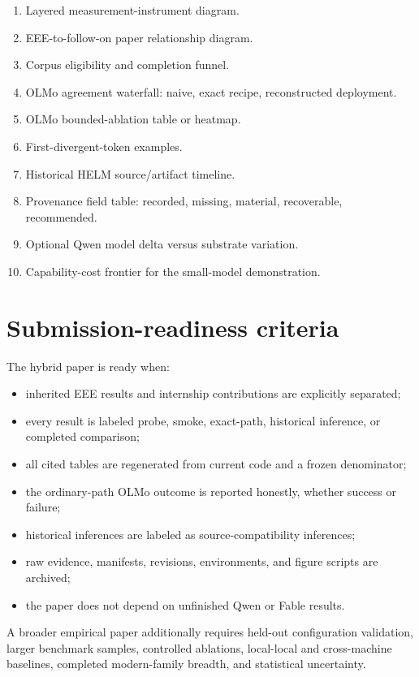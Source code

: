 \documentclass[11pt]{article}
\begin{document}
\begin{enumerate}
  \item Layered measurement-instrument diagram.
  \item EEE-to-follow-on paper relationship diagram.
  \item Corpus eligibility and completion funnel.
  \item OLMo agreement waterfall: naive, exact recipe, reconstructed deployment.
  \item OLMo bounded-ablation table or heatmap.
  \item First-divergent-token examples.
  \item Historical HELM source/artifact timeline.
  \item Provenance field table: recorded, missing, material, recoverable, recommended.
  \item Optional Qwen model delta versus substrate variation.
  \item Capability-cost frontier for the small-model demonstration.
\end{enumerate}

\section{Submission-readiness criteria}

The hybrid paper is ready when:

\begin{itemize}
  \item inherited EEE results and internship contributions are explicitly separated;
  \item every result is labeled probe, smoke, exact-path, historical inference, or completed comparison;
  \item all cited tables are regenerated from current code and a frozen denominator;
  \item the ordinary-path OLMo outcome is reported honestly, whether success or failure;
  \item historical inferences are labeled as source-compatibility inferences;
  \item raw evidence, manifests, revisions, environments, and figure scripts are archived;
  \item the paper does not depend on unfinished Qwen or Fable results.
\end{itemize}

A broader empirical paper additionally requires held-out configuration validation, larger benchmark samples, controlled ablations, local-local and cross-machine baselines, completed modern-family breadth, and statistical uncertainty.
\end{document}
